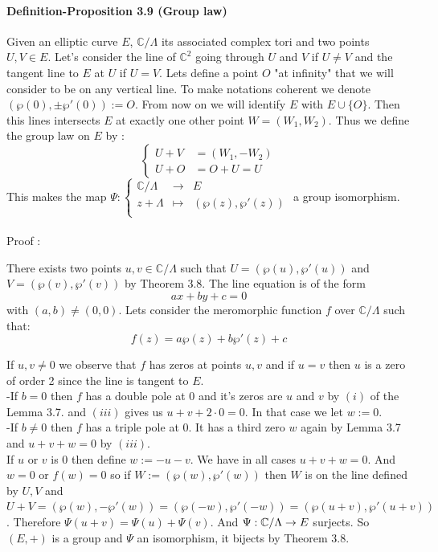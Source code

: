 \documentclass[letterpaper,10pt]{article}
\begin{document}
\paragraph{Definition-Proposition 3.9 (Group law)} Given an elliptic curve $E$, $\mathbb{C}/\Lambda$ its associated complex tori and two points $U,V \in E$. Let's consider the line of $\mathbb{C}^2$ going 
through $U$ and $V$ if $U \neq V$ and the tangent line to $E$ at $U$ if $U=V$. Lets define a point $O$ "at infinity" that we will consider to be
on any vertical line. To make notations coherent
 we denote $(\wp(0),\pm\wp'(0)) := O$. From now on we will identify $E$ with $E\cup\{O\}$.
Then this lines intersects $E$ at exactly one other point $W = (W_1,W_2)$.
Thus we define the group law on $E$ by : \[ \left\{ \begin{array}{rcl} U + V &=(W_1,-W_2) \\ U + O &= O + U = U \end{array}\right. \]
This makes the map $\Psi :   \left\{ \begin{array}{rcl} \mathbb{C}/\Lambda & \longrightarrow & E \\
  z + \Lambda & \longmapsto & (\wp(z),\wp'(z)) \\ \end{array} \right. $ a group isomorphism.

{\itshape \paragraph{} Proof :}
There exists two points $u,v\in\mathbb{C}/\Lambda $ such that $U=(\wp(u),\wp'(u))$ and $ V = (\wp(v),\wp'(v))$ by Theorem 3.8.
The line equation is of the form \[ ax + by + c = 0  \] with $(a,b) \neq (0,0)$. 
Lets consider the meromorphic function $f$ over $\mathbb{C}/\Lambda$ such that: \[ f(z) = a\wp(z) + b\wp'(z) + c \]

If $u,v \neq 0$ we observe that $f$ has zeros at points $u,v$ and if $u=v$ then $u$ is a zero of order 2 since the line is tangent to $E$.\\
-If $b=0$ then $f$ has a double pole at 0 and it's zeros are $u$ and $v$ by $(i)$ of the Lemma 3.7. 
and $(iii)$ gives us  $u + v + 2 \cdot 0  =0  $. In that case we let $w:= 0 $.\\
-If $b\neq 0$ then $f$ has a triple pole at 0. It has a third zero $w$ again by Lemma 3.7 and $u + v + w  = 0 $ by $(iii)$. \\
If $u$ or $v$ is 0 then define $w := - u -v$. 
We have in all cases $ u + v + w = 0$. 
And $w= 0$ or $f(w) = 0 $ so if $W := (\wp(w),\wp'(w))$ then $W$ is on the line defined by $U,V$ and 
$U+V = (\wp(w),-\wp'(w)) = (\wp(-w),\wp'(-w)) = (\wp(u + v),\wp'(u + v))$.
Therefore $\Psi(u + v) = \Psi(u) + \Psi(v)$. And $\Psi : \mathbb{C}/\Lambda \to E$ surjects. So $(E,+)$ is a group and $\Psi$ an isomorphism, it bijects by Theorem 3.8.
\end{document}

